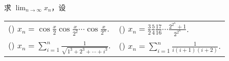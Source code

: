 \begin{example}
    求 $\displaystyle\lim_{n\to\infty}x_n$，设
    \setcounter{magicrownumbers}{0}
    \begin{table}[H]
        \centering
        \begin{tabular}{l | l}
            (\rownumber{}) $\displaystyle x_n=\cos\frac{x}{2}\cos\frac{x}{2^2}\cdots\cos\frac{x}{2^n}$. & (\rownumber{}) $\displaystyle x_n=\frac{3}{2}\frac{5}{4}\frac{17}{16}\cdots\frac{2^{2^n}+1}{2^{2^n}}$. \\
            (\rownumber{}) $\displaystyle x_n=\sum_{i=1}^n\frac{1}{\sqrt{1^3+2^3+\cdots+i^3}}$.         & (\rownumber{}) $\displaystyle x_n=\sum_{i=1}^n\frac{1}{i(i+1)(i+2)}$.
        \end{tabular}
    \end{table}
\end{example}
